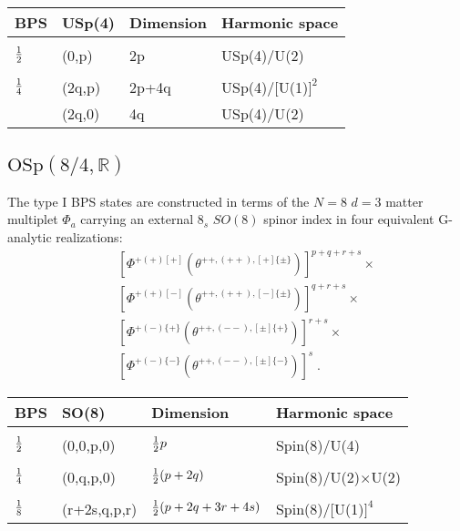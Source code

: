 \documentclass[a4paper,12pt]{article}
\begin{document}
\begin{table}[h]
  \begin{center}
    \leavevmode
\label{bps6} 
    \begin{tabular}{llll}
 BPS & USp(4) & Dimension & Harmonic space \\ \hline
  \\
 ${1\over 2}$ & (0,p) & 2p & USp(4)/U(2) \\
  \\
 ${1\over 4}$ & (2q,p) & 2p+4q & USp(4)/[U(1)$]^2$ \\ 
              & (2q,0) & 4q & USp(4)/U(2) \\
    \end{tabular}
  \end{center}
\end{table}
\vfill\eject  

\subsection{$\mbox{OSp}(8/4,\mathbb{R})$}

The type I BPS states are constructed in terms of the $N=8$ $d=3$ 
matter multiplet $\Phi_a$ carrying an external $8_s$ $SO(8)$ 
spinor index in four equivalent G-analytic realizations: 
\begin{eqnarray}
  &&[\Phi^{+(+)[+]}
(\theta^{++,(++),[+]\{\pm\}})]^{p+q+r+s}\times \nonumber\\ 
  &&[\Phi^{+(+)[-]} (\theta^{++,(++),[-]\{\pm\}})]^{q+r+s}\times  \nonumber\\ 
  &&[\Phi^{+(-)\{+\}} (\theta^{++,(--),[\pm]\{+\}})]^{r+s}\times 
\nonumber\\ 
  &&[\Phi^{+(-)\{-\}} 
(\theta^{++,(--),[\pm]\{-\}})]^{s}\;. \label{8.03} 
\end{eqnarray}


\begin{table}[h]
  \begin{center}
    \leavevmode
\label{bps3} 
    \begin{tabular}{llll}
 BPS & SO(8)  & Dimension & Harmonic space \\ \hline
  \\
 ${1\over 2}$ & (0,0,p,0) & ${1\over 2}p$ & Spin(8)/U(4) \\
  \\
 ${1\over 4}$ & (0,q,p,0) & ${1\over 2}(p+2q)$ & Spin(8)/U(2)$\times$U(2) \\
  \\ 
 ${1\over 8}$ & (r+2s,q,p,r) & ${1\over 2}(p+2q+3r+4s)$ & 
Spin(8)/[U(1)$]^4$ \\ 
    \end{tabular}
  \end{center}
\end{table}
\end{document}
